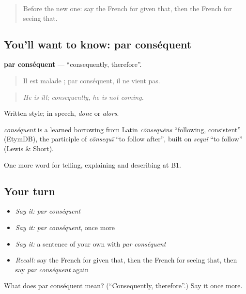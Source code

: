 \begin{quote}
Before the new one: say the French for given that, then the French for seeing that.
\end{quote}

\subsection*{You'll want to know: par conséquent}
\textbf{par conséquent} — \textquotedblleft{}consequently, therefore\textquotedblright{}.

\begin{quote}
Il est malade ; par conséquent, il ne vient pas.
\end{quote}

\begin{quote}
\emph{He is ill; consequently, he is not coming.}
\end{quote}

Written style; in speech, \emph{donc} or \emph{alors}.

\begin{cousinweb}
\emph{conséquent} is a learned borrowing from Latin \emph{cōnsequēns} \textquotedblleft{}following, consistent\textquotedblright{} (EtymDB), the participle of \emph{cōnsequī} \textquotedblleft{}to follow after\textquotedblright{}, built on \emph{sequī} \textquotedblleft{}to follow\textquotedblright{} (Lewis \& Short).
\end{cousinweb}

\begin{grammarlens}[title={What you've built}]
One more word for telling, explaining and describing at B1.
\end{grammarlens}

\subsection*{Your turn}
\begin{itemize}
\raggedright
  \item \emph{Say it:} \emph{par conséquent}
  \item \emph{Say it:} \emph{par conséquent}, once more
  \item \emph{Say it:} a sentence of your own with \emph{par conséquent}
  \item \emph{Recall:} say the French for given that, then the French for seeing that, then say \emph{par conséquent} again
\end{itemize}

\begin{tcolorbox}[breakable,colback=teal!4,colframe=teal!35!black,title={Before you move on}]
What does par conséquent mean? (\textquotedblleft{}Consequently, therefore\textquotedblright{}.) Say it once more.
\end{tcolorbox}

